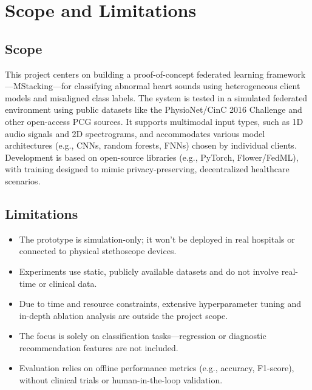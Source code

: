\section{Scope and Limitations}
\subsection*{Scope}
This project centers on building a proof-of-concept federated learning framework—MStacking—for classifying abnormal heart sounds using heterogeneous client models and misaligned class labels. The system is tested in a simulated federated environment using public datasets like the PhysioNet/CinC 2016 Challenge and other open-access PCG sources. It supports multimodal input types, such as 1D audio signals and 2D spectrograms, and accommodates various model architectures (e.g., CNNs, random forests, FNNs) chosen by individual clients. Development is based on open-source libraries (e.g., PyTorch, Flower/FedML), with training designed to mimic privacy-preserving, decentralized healthcare scenarios.

\subsection*{Limitations}
\begin{itemize}
    \item The prototype is simulation-only; it won’t be deployed in real hospitals or connected to physical stethoscope devices.
    \item Experiments use static, publicly available datasets and do not involve real-time or clinical data.
    \item Due to time and resource constraints, extensive hyperparameter tuning and in-depth ablation analysis are outside the project scope.
    \item The focus is solely on classification tasks—regression or diagnostic recommendation features are not included.
    \item Evaluation relies on offline performance metrics (e.g., accuracy, F1-score), without clinical trials or human-in-the-loop validation.
\end{itemize}
